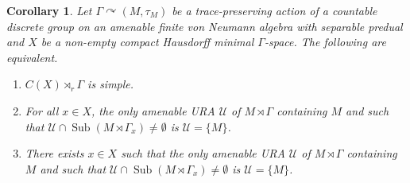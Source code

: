 \documentclass[12pt]{amsart} %
\theoremstyle{plain}
\newtheorem{corollary}[theorem]{Corollary}
\theoremstyle{definition}
\newcommand{\Ucal}{\mathcal{U}}
\DeclareMathOperator{\Sub}{Sub}
\begin{document}
\begin{corollary}\label{CorURACrossed} Let $\Gamma \curvearrowright (M,\tau_M)$ be a trace-preserving action of a countable discrete group on an
amenable finite von Neumann algebra with separable predual and  $X$ be a non-empty compact Hausdorff minimal $\Gamma$-space. The following are equivalent.
\begin{enumerate}
\item $C(X)\rtimes_r\Gamma$ is simple.
\item For all $x\in X$, the only amenable URA $\Ucal$ of $M\rtimes\Gamma$ containing $M$ and such that $\Ucal\cap\Sub(M\rtimes\Gamma_x)\neq\emptyset$  is $\Ucal=\{M\}$.
\item There exists $x\in X$ such that the only amenable URA $\Ucal$ of $M\rtimes\Gamma$ containing $M$ and such that $\Ucal\cap\Sub(M\rtimes\Gamma_x)\neq\emptyset$  is $\Ucal=\{M\}$.
\end{enumerate}
\end{corollary}
\end{document}
